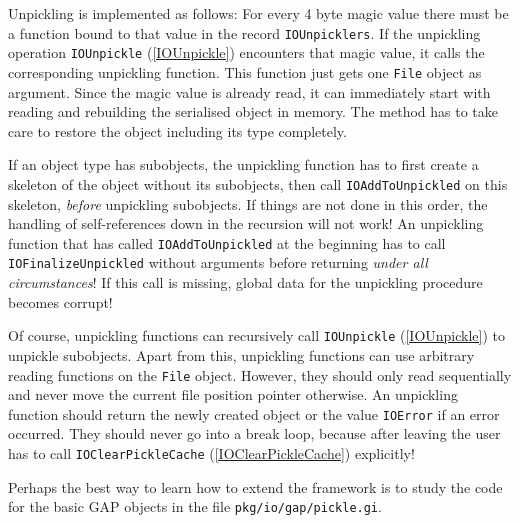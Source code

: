 \documentclass[a4paper,11pt]{report}
\begin{document}
{{ Unpickling is implemented as follows: For every 4 byte magic value there must
be a function bound to that value in the record \texttt{IO{\textunderscore}Unpicklers}. If the unpickling operation \texttt{IO{\textunderscore}Unpickle} (\ref{IOUnpickle}) encounters that magic value, it calls the corresponding unpickling function.
This function just gets one \texttt{File} object as argument. Since the magic value is already read, it can immediately
start with reading and rebuilding the serialised object in memory. The method
has to take care to restore the object including its type completely. 

 If an object type has subobjects, the unpickling function has to first create
a skeleton of the object without its subobjects, then call \texttt{IO{\textunderscore}AddToUnpickled} on this skeleton, \emph{before} unpickling subobjects. If things are not done in this order, the handling of
self-references down in the recursion will not work! An unpickling function
that has called \texttt{IO{\textunderscore}AddToUnpickled} at the beginning has to call \texttt{IO{\textunderscore}FinalizeUnpickled} without arguments before returning \emph{under all circumstances}! If this call is missing, global data for the unpickling procedure becomes
corrupt! 

 Of course, unpickling functions can recursively call \texttt{IO{\textunderscore}Unpickle} (\ref{IOUnpickle}) to unpickle subobjects. Apart from this, unpickling functions can use
arbitrary reading functions on the \texttt{File} object. However, they should only read sequentially and never move the current
file position pointer otherwise. An unpickling function should return the
newly created object or the value \texttt{IO{\textunderscore}Error} if an error occurred. They should never go into a break loop, because after
leaving the user has to call \texttt{IO{\textunderscore}ClearPickleCache} (\ref{IOClearPickleCache}) explicitly! 

 Perhaps the best way to learn how to extend the framework is to study the code
for the basic \textsf{GAP} objects in the file \texttt{pkg/io/gap/pickle.gi}. }

 }

 
\end{document}
